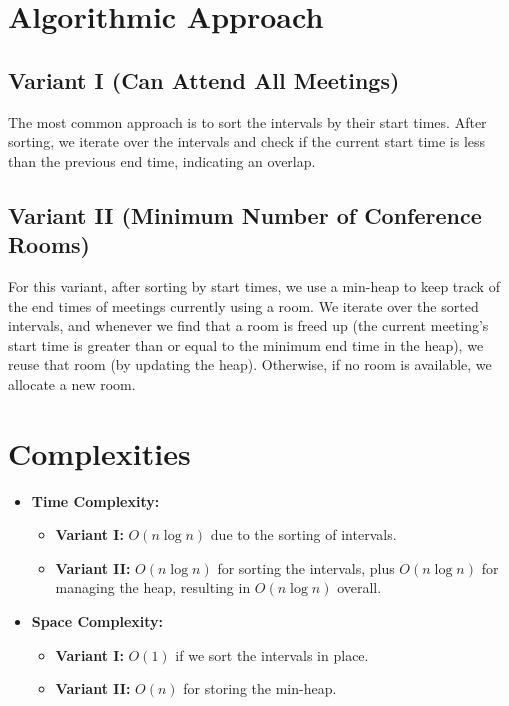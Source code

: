 \section*{Algorithmic Approach}

\subsection*{Variant I (Can Attend All Meetings)}
The most common approach is to sort the intervals by their start times. After sorting, we iterate over the intervals and check if the current start time is less than the previous end time, indicating an overlap.

\subsection*{Variant II (Minimum Number of Conference Rooms)}
For this variant, after sorting by start times, we use a min-heap to keep track of the end times of meetings currently using a room. We iterate over the sorted intervals, and whenever we find that a room is freed up (the current meeting's start time is greater than or equal to the minimum end time in the heap), we reuse that room (by updating the heap). Otherwise, if no room is available, we allocate a new room.

\section*{Complexities}
\begin{itemize}
	\item \textbf{Time Complexity:}
	\begin{itemize}
		\item \textbf{Variant I:} \(O(n \log n)\) due to the sorting of intervals.
		\item \textbf{Variant II:} \(O(n \log n)\) for sorting the intervals, plus \(O(n \log n)\) for managing the heap, resulting in \(O(n \log n)\) overall.
	\end{itemize}
	\item \textbf{Space Complexity:}
	\begin{itemize}
		\item \textbf{Variant I:} \(O(1)\) if we sort the intervals in place.
		\item \textbf{Variant II:} \(O(n)\) for storing the min-heap.
	\end{itemize}
\end{itemize}



